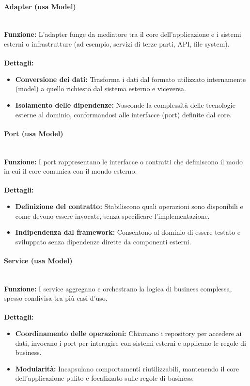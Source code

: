 \paragraph{Adapter (usa Model)}
\mbox{}\\
\textbf{Funzione:} L’adapter funge da mediatore tra il core dell’applicazione e i sistemi esterni o infrastrutture (ad esempio, servizi di terze parti, API, file system). \\
\mbox{}\\
\textbf{Dettagli:}
\begin{itemize}
  \item \textbf{Conversione dei dati:} Trasforma i dati dal formato utilizzato internamente (model) a quello richiesto dal sistema esterno e viceversa.
  \item \textbf{Isolamento delle dipendenze:} Nasconde la complessità delle tecnologie esterne al dominio, conformandosi alle interfacce (port) definite dal core.
\end{itemize}

\paragraph{Port (usa Model)}
\mbox{}\\
\textbf{Funzione:} I port rappresentano le interfacce o contratti che definiscono il modo in cui il core comunica con il mondo esterno. \\
\mbox{}\\
\textbf{Dettagli:}
\begin{itemize}
  \item \textbf{Definizione del contratto:} Stabiliscono quali operazioni sono disponibili e come devono essere invocate, senza specificare l’implementazione.
  \item \textbf{Indipendenza dal framework:} Consentono al dominio di essere testato e sviluppato senza dipendenze dirette da componenti esterni.
\end{itemize}

\paragraph{Service (usa Model)}
\mbox{}\\
\textbf{Funzione:} I service aggregano e orchestrano la logica di business complessa, spesso condivisa tra più casi d’uso. \\
\mbox{}\\
\textbf{Dettagli:}
\begin{itemize}
  \item \textbf{Coordinamento delle operazioni:} Chiamano i repository per accedere ai dati, invocano i port per interagire con sistemi esterni e applicano le regole di business.
  \item \textbf{Modularità:} Incapsulano comportamenti riutilizzabili, mantenendo il core dell’applicazione pulito e focalizzato sulle regole di business.
\end{itemize}

